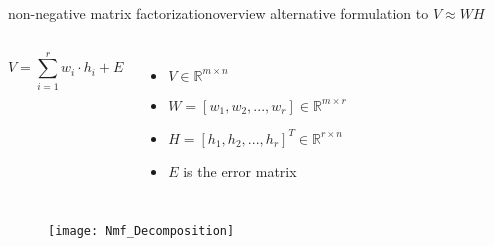         \begin{frame}{non-negative matrix factorization}{overview}
           alternative formulation to $V \approx WH$
            \begin{columns}
                \begin{equation*}
                V = \sum_{i = 1}^r w_{i} \cdot h_{i} + E
                \end{equation*}
			    \begin{itemize}
					\item  $V \in \mathbb{R}^{m \times n}$
					\item  $W = [w_{1}, w_{2}, ..., w_{r}] \in \mathbb{R}^{m \times r}$
					\item  $H  = [h_{1}, h_{2}, ..., h_{r}]^{T} \in \mathbb{R}^{r \times n}$
					\item  $E$ is the error matrix													   
				\end{itemize}			                   
            \end{columns}
            \begin{figure}
                    \texttt{[image: Nmf\_Decomposition]}
            \end{figure}
        \end{frame}        
        
